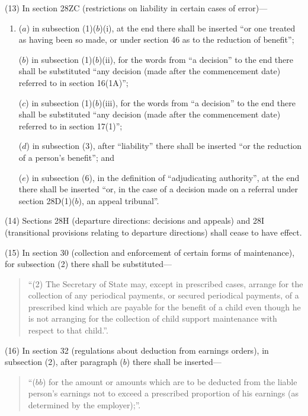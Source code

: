 \documentclass[12pt,a4paper]{article}
\begin{document}
(13) In section 28ZC (restrictions on liability in certain cases of error)—
\begin{enumerate}\item[]
($a$) in subsection (1)($b$)(i), at the end there shall be inserted “or one treated as having been so made, or under section 46 as to the reduction of benefit”;

($b$) in subsection (1)($b$)(ii), for the words from “a decision” to the end there shall be substituted “any decision (made after the commencement date) referred to in section 16(1A)”;

($c$) in subsection (1)($b$)(iii), for the words from “a decision” to the end there shall be substituted “any decision (made after the commencement date) referred to in section 17(1)”;

($d$) in subsection (3), after “liability” there shall be inserted “or the reduction of a person’s benefit”; and

($e$) in subsection (6), in the definition of “adjudicating authority”, at the end there shall be inserted “or, in the case of a decision made on a referral under section 28D(1)($b$), an appeal tribunal”.
\end{enumerate}

(14) Sections 28H (departure directions: decisions and appeals) and 28I (transitional provisions relating to departure directions) shall cease to have effect.

(15) In section 30 (collection and enforcement of certain forms of maintenance), for subsection (2)  there shall be substituted—
\begin{quotation}
“(2) The Secretary of State may, except in prescribed cases, arrange for the collection of any periodical payments, or secured periodical payments, of a prescribed kind which are payable for the benefit of a child even though he is not arranging for the collection of child support maintenance with respect to that child.”.
\end{quotation}

(16) In section 32 (regulations about deduction from earnings orders), in subsection (2), after paragraph ($b$)  there shall be inserted—
\begin{quotation}
“($bb$) for the amount or amounts which are to be deducted from the liable person’s earnings not to exceed a prescribed proportion of his earnings (as determined by the employer);”.
\end{quotation}
\end{document}
